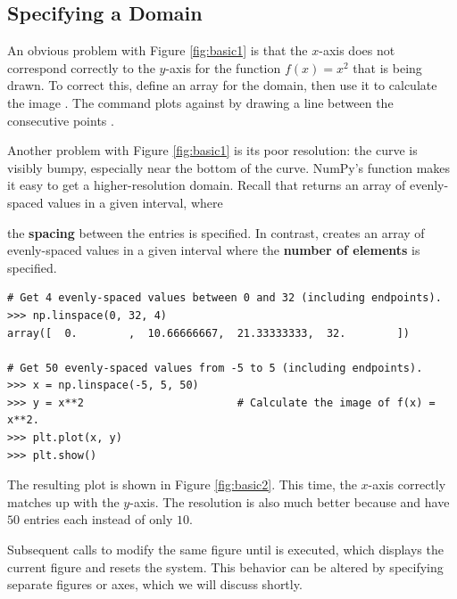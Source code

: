 \subsection*{Specifying a Domain} %

An obvious problem with Figure \ref{fig:basic1} is that the $x$-axis does not correspond correctly to the $y$-axis for the function $f(x) = x^2$ that is being drawn.
To correct this, define an array  for the domain, then use it to calculate the image .
The command  plots  against  by drawing a line between the consecutive points .

Another problem with Figure \ref{fig:basic1} is its poor resolution: the curve is visibly bumpy, especially near the bottom of the curve.
NumPy's  function makes it easy to get a higher-resolution domain.
Recall that  returns an array of evenly-spaced values in a given interval, where


\noindent the \textbf{spacing} between the entries is specified.
In contrast,  creates an array of evenly-spaced values in a given interval where the \textbf{number of elements} is specified.

\begin{lstlisting}
# Get 4 evenly-spaced values between 0 and 32 (including endpoints).
>>> np.linspace(0, 32, 4)
array([  0.        ,  10.66666667,  21.33333333,  32.        ])

# Get 50 evenly-spaced values from -5 to 5 (including endpoints).
>>> x = np.linspace(-5, 5, 50)
>>> y = x**2                        # Calculate the image of f(x) = x**2.
>>> plt.plot(x, y)
>>> plt.show()
\end{lstlisting}

The resulting plot is shown in Figure \ref{fig:basic2}.
This time, the $x$-axis correctly matches up with the $y$-axis.
The resolution is also much better because  and  have $50$ entries each instead of only $10$.

Subsequent calls to  modify the same figure until  is executed, which displays the current figure and resets the system.
This behavior can be altered by specifying separate figures or axes, which we will discuss shortly.

